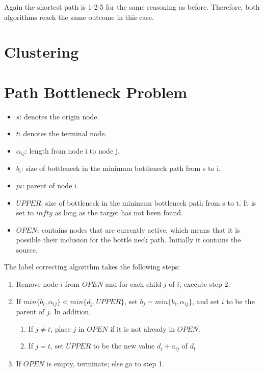 \documentclass[11pt, oneside]{article}   	%
\begin{document}
Again the shortest path is 1-2-5 for the same reasoning as before. Therefore, both algorithms reach the same outcome in this case.


\section{Clustering}


\section{Path Bottleneck Problem}

\begin{itemize}
	\item $s$: denotes the origin node.
	\item $t$: denotes the terminal node.
	\item $\alpha_{ij}$: length from node i to node j.
	\item $b_{i}$: size of bottleneck in the minimum bottleneck path from s to i.
	\item $p{i}$: parent of node i.
	\item $UPPER$: size of bottleneck in the minimum bottleneck path from s to t. It is set to $infty$ as long as the target has not been found.
	\item $OPEN$: contains nodes that are currently active, which means that it is possible their inclusion for the bottle neck path. Initially it contains the source.
\end{itemize}
The label correcting algorithm takes the following steps:
\begin{enumerate}
	\item Remove node $i$ from $OPEN$ and for each child $j$ of $i$, execute step 2.
	\item If $min\{b_{i},\alpha_{ij}\} < min\{d_{j},UPPER\}$, set $b_{j}=min\{b_{i},\alpha_{ij}\}$, and set $i$ to be the parent of $j$. In addition,
	\begin{enumerate}
		\item If $j \neq t$, place $j$ in $OPEN$ if it is not already in $OPEN$.
		\item If $j = t$, set $UPPER$ to be the new value $d_{i}+a_{ij}$ of $d_{t}$
	\end{enumerate}
	\item If $OPEN$ is empty, terminate; else go to step 1.
\end{enumerate}
\end{document}
